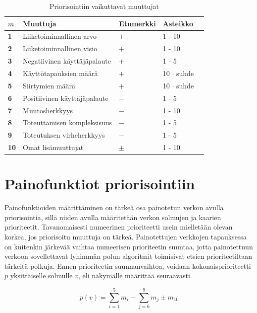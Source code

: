   \begin{table}[H]
    \caption{Priorisointiin vaikuttavat muuttujat}
    \label{tab:priorisointiin_vaikuttavat_muuttujat}
    \centering
    \begin{tabular}{lllll} \hline
    \(m\) & \textbf{Muuttuja} & \textbf{Etumerkki} & \textbf{Asteikko} &  \\ \hline
    \textbf{1} & Liiketoiminnallinen arvo & \(+\) & 1 - 10 &  \\
    \textbf{2} & Liiketoiminnallinen visio & \(+\) & 1 - 10 &  \\
    \textbf{3} & Negatiivinen käyttäjäpalaute & \(+\) & 1 - 5 &  \\
    \textbf{4} & Käyttötapauksien määrä & \(+\) & 10 \(\cdot\) suhde &  \\
    \textbf{5} & Siirtymien määrä & \(+\) & 10 \(\cdot\) suhde &  \\
    \textbf{6} & Positiivinen käyttäjäpalaute & \(-\) & 1 - 5 &  \\
    \textbf{7} & Muutosherkkyys & \(-\) & 1 - 10 &  \\
    \textbf{8} & Toteuttamisen kompleksisuus & \(-\) & 1 - 5 &  \\
    \textbf{9} & Toteutuksen virheherkkyys & \(-\) & 1 - 5 &  \\
    \textbf{10} & Omat lisämuuttujat & \(\pm\) & 1 - 10 & \\ \hline
    \end{tabular}
  \end{table}

\section{Painofunktiot priorisointiin} \label{ch:10_painofunktiot_priorisointiin}

  Painofunktioiden määrittäminen on tärkeä osa painotetun verkon avulla priorisointia, sillä niiden avulla määritetään verkon solmujen ja kaarien prioriteetit.
  Tavanomaisesti numeerinen prioriteetti usein mielletään olevan korkea, jos priorisoitu muuttuja on tärkeä.
  Painotettujen verkkojen tapauksessa on kuitenkin järkevää vaihtaa numeerisen prioriteetin suuntaa, jotta painotettuun verkoon sovellettavat lyhimmän polun algoritmit toimisivat etsien prioriteetiltaan tärkeitä polkuja. Ennen prioriteetin suunnanvaihtoa, voidaan kokonaisprioriteetti \(p\) yksittäiselle solmulle \(v\), eli näkymälle määrittää seuraavasti.

  \[p(v) = \sum\limits_{i=1}^{5} m_i - \sum\limits_{j=6}^{9} m_j \pm m_{10}\]

